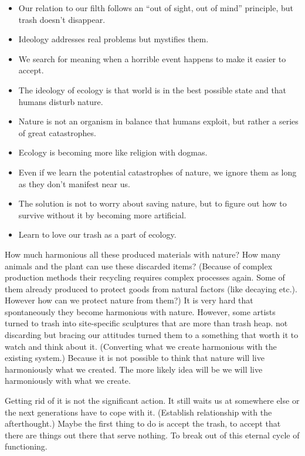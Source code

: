 \begin{itemize}
\item Our relation to our filth follows an “out of sight, out of mind” principle, but trash doesn’t disappear.
\item Ideology addresses real problems but mystifies them.
\item We search for meaning when a horrible event happens to make it easier to accept.
\item The ideology of ecology is that world is in the best possible state and that humans disturb nature.
\item Nature is not an organism in balance that humans exploit, but rather a series of great catastrophes.
\item Ecology is becoming more like religion with dogmas.
\item Even if we learn the potential catastrophes of nature, we ignore them as long as they don’t manifest near us.
\item The solution is not to worry about saving nature, but to figure out how to survive without it by becoming more artificial.
\item Learn to love our trash as a part of ecology.
\end{itemize}	

How much harmonious all these produced materials with nature? How many animals and the plant can use these discarded items? (Because of complex production methods their recycling requires complex processes again. Some of them already produced to protect goods from natural factors (like decaying etc.). However how can we protect nature from them?) It is very hard that spontaneously they become harmonious with nature. However, some artists turned to trash into site-specific sculptures that are more than trash heap. not discarding but bracing our attitudes turned them to a something that worth it to watch and think about it. (Converting what we create harmonious with the existing system.) Because it is not possible to think that nature will live harmoniously what we created. The more likely idea will be we will live harmoniously with what we create.

Getting rid of it is not the significant action. It still waits us at somewhere else or the next generations have to cope with it. (Establish relationship with the afterthought.) Maybe the first thing to do is accept the trash, to accept that there are things out there that serve nothing. To break out of this eternal cycle of functioning.


